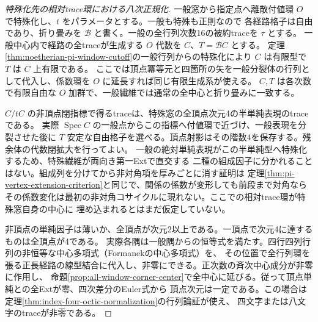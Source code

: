 \begin{proof}[特殊化先の相対trace環における八次正規化]
一般窓から指定点へ離散付値環 $O$ で特殊化し、$t$ をパラメータとする。一般も特殊も正則なので
各経路格子は自由であり、折り畳みを $\mathcal B$ と書く。一般の全行列次数16の被約traceを $\tau$ とする。
一般中心内で経路の全traceが生成する $O$ 代数を $C$、$T=\mathcal B C$ とする。
定理\ref{thm:noetherian-pi-window-cutoff}の一般行列からの特殊化により $C$ は有限型で $T$ は $C$ 上有限である。
ここでは頂点冪等元と四箇所の矢を一般分裂体の行列として代入し、係数環を $O$ に延長すれば同じ有限生成系が使える。
$C,T$ は各次数で有限自由な $O$ 加群で、一般繊維では通常の全中心と折り畳みに一致する。

$C/tC$ の非頂点閉指標で得るtraceは、特殊窓の全頂点次元4の半単純表現のtraceである。
実際 $\operatorname{Spec} C$ の一般点からこの指標へ付値環で近づけ、一般表現を分裂させた後に
$T$ 安定な自由格子を選べる。頂点射影はその階数4を保存する。残余体の代数閉拡大を行ってよい。
一般の絶対単純表現がこの半単純型へ特殊化するため、特殊繊維が両向き第一Extで直交する
二種の組成因子に分かれることはない。組成列を分けてから非対角項を厚みごとに消す証明は
定理\ref{thm:pi-vertex-extension-criterion}と同じで、関係の係数が変形しても前段まで対角なら
その係数変化は最初の非対角コサイクルに現れない。ここでの相対trace環が特殊窓自身の中心に
埋め込まれるとはまだ仮定していない。

非頂点の単純因子は薄いか、全頂点が次元2以上である。一頂点で次元4に達するものは全頂点が4である。
実際各隅は一般隅からの恒等式を満たす。四行四列行列の非恒等な中心多項式（Formanekの中心多項式）を、
その位置で全行列環を張る正長経路の線型結合に代入し、非零にできる。正次数の斉次中心成分が非零に作用し、
命題\ref{prop:all-window-corner-center}で全中心に延びる。従って頂点単純との全Extが零、四次差分のEuler式から
頂点次元は一定である。この場合は定理\ref{thm:index-four-octic-normalization}の行列論証が使え、
四文字または八文字のtraceが非零である。


\end{proof}

